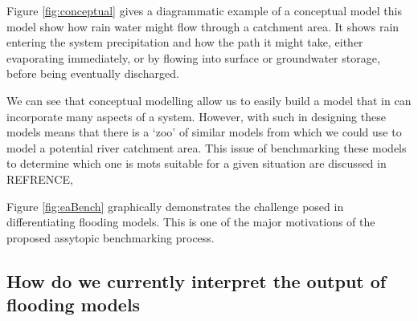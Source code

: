 \documentclass[11pt]{article}
\begin{document}
\hspace{0.05\textwidth}
\begin{minipage}{0.4\textwidth}
    Figure \ref{fig:conceptual} gives a diagrammatic example of a conceptual model this model show how rain water might flow through a catchment area. It shows rain entering the system precipitation and how the path it might take, either evaporating immediately, or by flowing into surface or groundwater storage, before being eventually discharged.

    We can see that conceptual modelling allow us to easily build a model that in can incorporate many aspects of a system. However, with such in designing these models means that there is a `zoo' of similar models from which we could use to model a potential river catchment area. This issue of benchmarking these models to determine which one is mots suitable for a given situation are discussed in REFRENCE, 

    Figure \ref{fig:eaBench}  graphically demonstrates the challenge posed in differentiating flooding models. This is one of the major motivations of the proposed assytopic benchmarking process.
\end{minipage}







\subsection{How do we currently interpret the output of flooding models}
\end{document}
